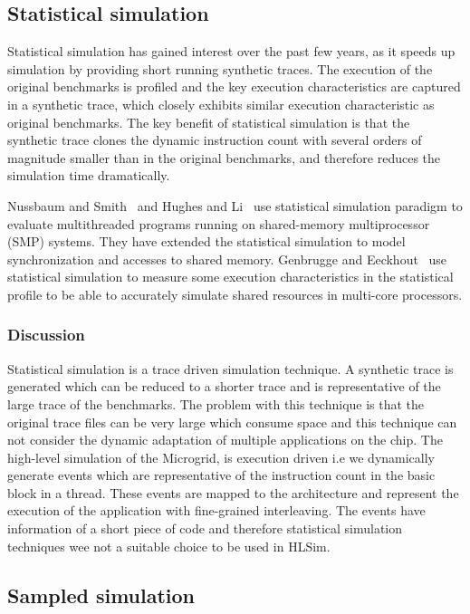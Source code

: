 \documentclass{article}
\begin{document}
\subsection{Statistical simulation}

Statistical simulation has gained interest over the past few years, as it
speeds up simulation by providing short running synthetic traces. The execution
of the original benchmarks is profiled and the key execution characteristics
are captured in a synthetic trace, which closely exhibits similar execution
characteristic as original benchmarks. The key benefit of statistical
simulation is that the synthetic trace clones the dynamic instruction count
with several orders of magnitude smaller than in the original benchmarks, and
therefore reduces the simulation time dramatically.

Nussbaum and Smith~\cite{884500} and Hughes and Li~\cite{citeulike:7771260} use
statistical simulation paradigm to evaluate multithreaded programs running on
shared-memory multiprocessor (SMP) systems. They have extended the statistical
simulation to model synchronization and accesses to shared memory. Genbrugge
and Eeckhout~\cite{Eeckhout:2003:SSA:1435585.1435761,200977} use statistical
simulation to measure some execution characteristics in the statistical profile
to be able to accurately simulate shared resources in multi-core processors.

\subsubsection*{Discussion}

Statistical simulation is a trace driven simulation technique. A synthetic
trace is generated which can be reduced to a shorter trace and is
representative of the large trace of the benchmarks. The problem with this
technique is that the original trace files can be very large which consume 
space and this technique can not consider the dynamic adaptation of multiple
applications on the chip. The high-level simulation of the Microgrid, is
execution driven i.e we dynamically generate events which are representative
of the instruction count in the basic block in a thread. These events are
mapped to the architecture and represent the execution of the application with
fine-grained interleaving. The events have information of a short piece of code
and therefore statistical simulation techniques wee not a suitable choice to be
used in HLSim.

\subsection{Sampled simulation}
\end{document}
